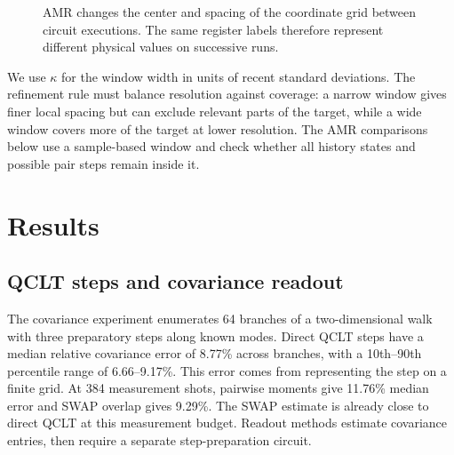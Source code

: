 \documentclass[twocolumn,reprint,aps,prd,floatfix,amsmath,amssymb]{revtex4-2}
\begin{document}
\begin{figure}[!t]
\centering
{}
\caption{AMR changes the center and spacing of the coordinate grid between circuit executions. The same register labels therefore represent different physical values on successive runs.}
\label{fig:amr-grid}
\end{figure}

We use $\kappa$ for the window width in units of recent standard deviations. The refinement rule must balance resolution against coverage: a narrow window gives finer local spacing but can exclude relevant parts of the target, while a wide window covers more of the target at lower resolution. The AMR comparisons below use a sample-based window and check whether all history states and possible pair steps remain inside it.

\section{Results}

\subsection{QCLT steps and covariance readout}

The covariance experiment enumerates 64 branches of a two-dimensional walk with three preparatory steps along known modes. Direct QCLT steps have a median relative covariance error of 8.77\% across branches, with a 10th--90th percentile range of 6.66--9.17\%. This error comes from representing the step on a finite grid. At 384 measurement shots, pairwise moments give 11.76\% median error and SWAP overlap gives 9.29\%. The SWAP estimate is already close to direct QCLT at this measurement budget. Readout methods estimate covariance entries, then require a separate step-preparation circuit.
\end{document}
